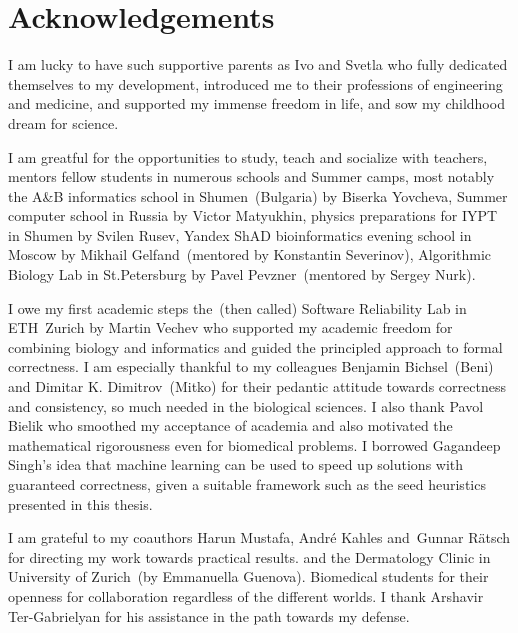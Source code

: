 
\bigskip

\begingroup
\let\clearpage\relax
\let\cleardoublepage\relax
\let\cleardoublepage\relax
\chapter*{Acknowledgements}

\def\thanks#1{%
\begingroup
\leftskip1em
\noindent #1
\par
\endgroup
}

I am lucky to have such supportive parents as Ivo and Svetla who fully dedicated
themselves to my development, introduced me to their professions of engineering
and medicine, and supported my immense freedom in life, and sow my childhood
dream for science.

I am greatful for the opportunities to study, teach and socialize with teachers,
mentors fellow students in numerous schools and Summer camps, most notably the
A\&B informatics school in Shumen~(Bulgaria) by Biserka Yovcheva, Summer
computer school in Russia by Victor Matyukhin, physics preparations for IYPT in
Shumen by Svilen Rusev, Yandex ShAD bioinformatics evening school in Moscow by
Mikhail Gelfand~(mentored by Konstantin Severinov), Algorithmic Biology Lab in
St.Petersburg by Pavel Pevzner~(mentored by Sergey Nurk).

I owe my first academic steps the~(then called) Software Reliability Lab in
ETH~Zurich by Martin Vechev who supported my academic freedom for combining
biology and informatics and guided the principled approach to formal
correctness. I am especially thankful to my colleagues Benjamin Bichsel~(Beni)
and Dimitar K. Dimitrov~(Mitko) for their pedantic attitude towards correctness
and consistency, so much needed in the biological sciences. I also thank Pavol
Bielik who smoothed my acceptance of academia and also motivated the
mathematical rigorousness even for biomedical problems. I borrowed Gagandeep
Singh's idea that machine learning can be used to speed up solutions with
guaranteed correctness, given a suitable framework such as the seed heuristics
presented in this thesis.

I am grateful to my coauthors Harun Mustafa, André Kahles and Gunnar Rätsch for
directing my work towards practical results. and the Dermatology Clinic in
University of Zurich~(by Emmanuella Guenova). Biomedical students for their
openness for collaboration regardless of the different worlds. I thank Arshavir
Ter-Gabrielyan for his assistance in the path towards my defense.

